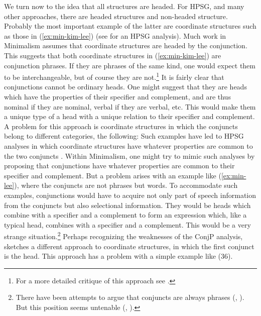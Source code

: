 \documentclass[output=paper]{langsci/langscibook}
\begin{document}
We turn now to the idea that all structures are headed. For HPSG, and many other approaches, there are headed structures and non-headed structure. Probably the most important example of the latter are coordinate structures such as those in (\ref{ex:min-kim-lee}) (see \citealt{Sag.2003} for an HPSG analysis).
\label{ex:min-kim-lee}
\z
Much work in Minimalism assumes that coordinate structures are headed by the conjunction. This suggests that both coordinate structures in (\ref{ex:min-kim-lee}) are conjunction phrases. If they are phrases of the same kind, one would expect them to be interchangeable, but of course they are not.\footnote{%
	For a more detailed critique of this approach see \citet{Borsley2005a}.%
}
\label{ex:min-sang-dance}
\z
It is fairly clear that conjunctions cannot be ordinary heads. One might suggest that they are heads which have the properties of their specifier and complement, and are thus nominal if they are nominal, verbal if they are verbal, etc. This would make them a unique type of a head with a unique relation to their specifier and complement. A problem for this approach is coordinate structures in which the conjuncts belong to different categories, \eg the following:
\eal
{}\label{ex:min-hobbs-linguist}
\label{ex:min-hobbs-angry}
\zl 
Such examples have led to HPSG analyses in which coordinate structures have whatever properties are common to the two conjuncts \citep{Sag.2003}. Within Minimalism, one might try to mimic such analyses by proposing that conjunctions have whatever properties are common to their specifier and complement. But a problem arises with an example like (\ref{ex:min-lee}), where the conjuncts are not phrases but words.
\label{ex:min-kim-criticized}
\z
To accommodate such examples, conjunctions would have to acquire not only part of speech information from the conjuncts but also selectional information. They would be heads which combine with a specifier and a complement to form an expression which, like a typical head, combines with a specifier and a complement. This would be a very strange situation.\footnote{%
	There have been attempts to argue that conjuncts are always phrases (\citealt{Kayne94a-u}, \citealt{Bruening2018a}). But this position seems untenable (\citealt{Abeille2006a}, \citealt{MuellerLexicalism}).%
}
Perhaps recognizing the weaknesses of the ConjP analysis, \citet{Chomsky2013a} sketches a different approach to coordinate structures, in which the first conjunct is the head. This approach has a problem with a simple example like (36).
\end{document}
